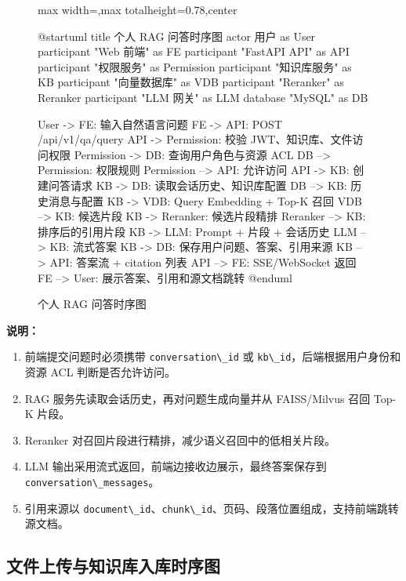 \documentclass[a4paper,zihao=-4]{ctexart}
\providecommand{\tightlist}{%
  \setlength{\itemsep}{0pt}\setlength{\parskip}{0pt}}
\providecommand{\passthrough}[1]{#1}
\begin{document}
\begin{figure}[H]
\centering
\begin{adjustbox}{max width=\linewidth,max totalheight=0.78\textheight,center}
\begingroup
\renewcommand{\PlantUMLJobname}{plantuml-diagrams/req-uml-03}
\begin{plantuml}
@startuml
title 个人 RAG 问答时序图
actor 用户 as User
participant "Web 前端" as FE
participant "FastAPI API" as API
participant "权限服务" as Permission
participant "知识库服务" as KB
participant "向量数据库" as VDB
participant "Reranker" as Reranker
participant "LLM 网关" as LLM
database "MySQL" as DB

User -> FE: 输入自然语言问题
FE -> API: POST /api/v1/qa/query
API -> Permission: 校验 JWT、知识库、文件访问权限
Permission -> DB: 查询用户角色与资源 ACL
DB --> Permission: 权限规则
Permission --> API: 允许访问
API -> KB: 创建问答请求
KB -> DB: 读取会话历史、知识库配置
DB --> KB: 历史消息与配置
KB -> VDB: Query Embedding + Top-K 召回
VDB --> KB: 候选片段
KB -> Reranker: 候选片段精排
Reranker --> KB: 排序后的引用片段
KB -> LLM: Prompt + 片段 + 会话历史
LLM --> KB: 流式答案
KB -> DB: 保存用户问题、答案、引用来源
KB --> API: 答案流 + citation 列表
API --> FE: SSE/WebSocket 返回
FE --> User: 展示答案、引用和源文档跳转
@enduml
\end{plantuml}
\endgroup
\end{adjustbox}
\caption{个人 RAG 问答时序图}
\end{figure}

\textbf{说明：}

\begin{enumerate}
\def\labelenumi{\arabic{enumi}.}
\tightlist
\item
  前端提交问题时必须携带 \passthrough{\lstinline!conversation\_id!} 或
  \passthrough{\lstinline!kb\_id!}，后端根据用户身份和资源 ACL
  判断是否允许访问。
\item
  RAG 服务先读取会话历史，再对问题生成向量并从 FAISS/Milvus 召回 Top-K
  片段。
\item
  Reranker 对召回片段进行精排，减少语义召回中的低相关片段。
\item
  LLM 输出采用流式返回，前端边接收边展示，最终答案保存到
  \passthrough{\lstinline!conversation\_messages!}。
\item
  引用来源以
  \passthrough{\lstinline!document\_id!}、\passthrough{\lstinline!chunk\_id!}、页码、段落位置组成，支持前端跳转源文档。
\end{enumerate}

\hypertarget{ux6587ux4ef6ux4e0aux4f20ux4e0eux77e5ux8bc6ux5e93ux5165ux5e93ux65f6ux5e8fux56fe}{%
\subsection{文件上传与知识库入库时序图}\label{ux6587ux4ef6ux4e0aux4f20ux4e0eux77e5ux8bc6ux5e93ux5165ux5e93ux65f6ux5e8fux56fe}}
\end{document}
